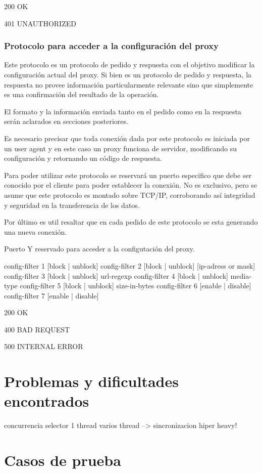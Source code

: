 \documentclass[a4paper,10pt]{article}
\begin{document}
200 OK

401 UNAUTHORIZED

\newpage
\subsubsection{Protocolo para acceder a la configuración del proxy}


Este protocolo es un protocolo de pedido y respuesta con el objetivo modificar la 
configuraci\'on actual del proxy. Si bien es un protocolo de pedido y respuesta, la 
respuesta no provee informaci\'on particularmente relevante sino que simplemente es 
una confirmaci\'on del resultado de la operaci\'on. 

El formato y la informaci\'on enviada tanto en el pedido como en la respuesta ser\'an 
aclarados en secciones posteriores.

Es necesario precisar que toda conexi\'on dada por este protocolo es iniciada por un user 
agent y en este caso un proxy funciona de servidor, modificando su configuraci\'on y retornando 
un c\'odigo de respuesta.

Para poder utilizar este protocolo se reservar\'a un puerto especifico que debe ser conocido 
por el cliente para poder establecer la conexi\'on. No es exclusivo, pero se asume que este 
protocolo es montado sobre TCP/IP, corroborando as\'i integridad y seguridad en la transferencia 
de los datos.

Por \'ultimo es util resaltar que en cada pedido de este protocolo se esta generando una nueva 
conexi\'on.

Puerto Y reservado para acceder a la configutaci\'on del proxy.

config-filter 1 [block | unblock]
config-filter 2 [block | unblock] [ip-adress or mask]
config-filter 3 [block | unblock] url-regexp
config-filter 4 [block | unblock] media-type
config-filter 5 [block | unblock] size-in-bytes
config-filter 6 [enable | disable]
config-filter 7 [enable | disable]


200 OK

400 BAD REQUEST

500 INTERNAL ERROR

\newpage
\section{Problemas y dificultades encontrados}

concurrencia
selector 1 thread  varios thread --> sincronizacion hiper heavy!

\newpage
\section{Casos de prueba}
\end{document}
